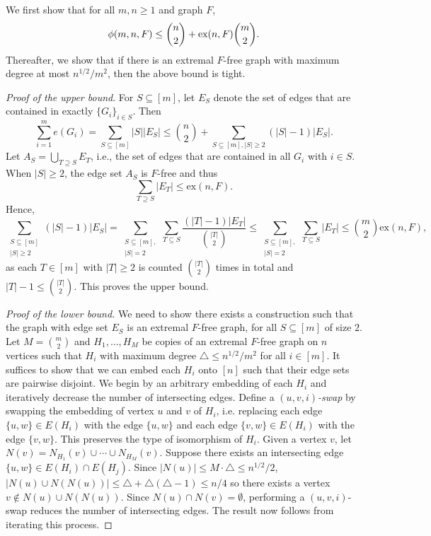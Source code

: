 \documentclass[12pt]{article}
\newcommand*{\ex}{\textnormal{ex}}
\begin{document}
We first show that for all 
$m,n \geq 1$ and graph $F$, 
\[  \phi(m, n ,F) \leq \binom{n}{2} + \ex(n, F)\binom{m}{2}.
  \]
Thereafter, we show that if there is an extremal $F$-free graph with maximum degree at most $n^{1/2}/m^2$, then the above bound is tight. 

\textit{Proof of the upper bound}. For $S \subseteq [m]$, let $E_S$ denote the set of edges that are contained in exactly $\{G_i\}_{i \in S}$. Then 
\[
  \sum_{i = 1}^m e(G_i) = \sum_{S \subseteq [m]} |S||E_S| \leq \binom{n}{2} + \sum_{S \subseteq [m], |S| \geq 2} (|S| - 1)|E_S|.
\]
Let $A_S = \bigcup_{T \supseteq S} E_T$, i.e., the set of edges that are contained in all $G_i$ with $i \in S$. When $|S| \geq 2$, the edge set $A_S$ is $F$-free and thus 
\[
  \sum_{T \supseteq S} |E_T| \leq \text{ex}(n, F).
\]
Hence,
\[
  \sum_{\substack{S \subseteq [m] \\ |S| \geq 2}} (|S| - 1)|E_S| = \sum_{\substack{S \subseteq [m], \\ |S| = 2}} \sum_{T \subseteq S} \frac{(|T| - 1)|E_T|}{\binom{|T|}{2}} \leq \sum_{\substack{S \subseteq [m], \\ |S| = 2}} \sum_{T \subseteq S} |E_T| \leq \binom{m}{2}\text{ex}(n, F),
\]
as each $T \in [m]$ with $|T| \geq 2$ is counted $\binom{|T|}{2}$ times in total and $|T| - 1 \leq \binom{|T|}{2}$. This proves the upper bound.

\begin{proof}[Proof of the lower bound]
  We need to show there exists a construction such that the graph with edge set $E_S$ is an extremal $F$-free graph, for all $S \subseteq [m]$ of size $2$. Let $M = \binom{m}{2}$ and $H_1, \ldots, H_M$ be copies of an extremal $F$-free graph on $n$ vertices such that $H_i$ with maximum degree $\triangle \leq n^{1/2}/m^2$ for all $i \in [m]$. It suffices to show that we can embed each $H_i$ onto $[n]$ such that their edge sets are pairwise disjoint. We begin by an arbitrary embedding of each $H_i$ and iteratively decrease the number of intersecting edges. Define a \textit{$(u, v, i)$-swap} by swapping the embedding of vertex $u$ and $v$ of $H_i$, i.e. replacing each edge $\{u, w\} \in E(H_i)$ with the edge $\{u, w\}$ and each edge $\{v, w\} \in E(H_i)$ with the edge $\{v, w\}$. This preserves the type of isomorphism of $H_i$. Given a vertex $v$, let $N(v) = N_{H_1}(v) \cup \cdots \cup N_{H_M}(v)$. Suppose there exists an intersecting edge $\{u, w\} \in E(H_i) \cap E(H_j)$. Since $|N(u)| \leq M \cdot \triangle \leq n^{1/2}/2$, $|N(u) \cup N(N(u))| \leq \triangle + \triangle(\triangle - 1) \leq n/4$ so there exists a vertex $v \notin N(u) \cup N(N(u))$. Since $N(u) \cap N(v) = \emptyset$, performing a $(u, v, i)$-swap reduces the number of intersecting edges. The result now follows from iterating this process.
\end{proof}
\end{document}
